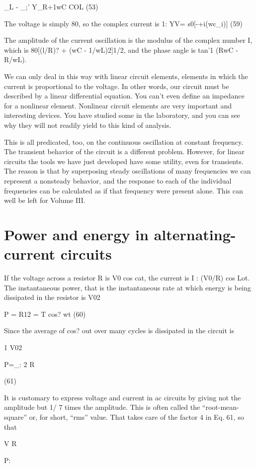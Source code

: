 {_L - _;'
Y_R+1wC COL (53)

The voltage is simply 80, so the complex current is
1: YV= s0[-+i(wc_i)] (59)

The amplitude of the current oscillation is the modulus of the complex
number I, which is 80[(l/R)? + (wC - 1/wL)2]1/2, and the
phase angle is tan'1 (RwC - R/wL).

We can only deal in this way with linear circuit elements, elements
in which the current is proportional to the voltage. In other words,
our circuit must be described by a linear differential equation. You
can't even define an impedance for a nonlinear element. Nonlinear
circuit elements are very important and interesting devices. You
have studied some in the laboratory, and you can see why they will
not readily yield to this kind of analysis.

This is all predicated, too, on the continuous oscillation at constant
frequency. The transient behavior of the circuit is a different
problem. However, for linear circuits the tools we have just developed
have some utility, even for transients. The reason is that by
superposing steady oscillations of many frequencies we can represent
a nonsteady behavior, and the response to each of the individual
frequencies can be calculated as if that frequency were present alone.
This can well be left for Volume III.

\section{Power and energy in alternating-current circuits}
If the voltage across a resistor R is V0 cos cat, the current is
I : (V0/R) cos Lot. The instantaneous power, that is the instantaneous
rate at which energy is being dissipated in the resistor is
V02

P = R12 = T cos? wt (60)

Since the average of cos? out over many cycles is %
dissipated in the circuit is

1 V02

P=_:
2 R

(61)

It is customary to express voltage and current in ac circuits by giving
not the amplitude but 1/ \/7 times the amplitude. This is often called
the ``root-mean-square'' or, for short, ``rms'' value. That takes care
of the factor 4 in Eq. 61, so that

V%
R

P:

}
